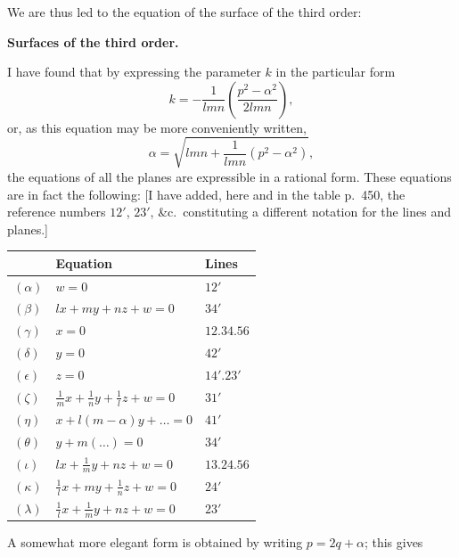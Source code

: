 \documentclass[11pt,a4paper]{book}
\begin{document}
We are thus led to the equation of the surface of the third order:

\newpage

\setcounter{page}{447}

\begin{center}
\textbf{Surfaces of the third order.}
\end{center}

I have found that by expressing the parameter $k$ in the particular form
\[
k = -\frac{1}{lmn}\left(\frac{p^{2} - \alpha^{2}}{2lmn}\right),
\]
or, as this equation may be more conveniently written,
\[
\alpha = \sqrt{lmn + \frac{1}{lmn}(p^{2} - \alpha^{2})},
\]
the equations of all the planes are expressible in a rational form. These equations are in fact the following: [I have added, here and in the table p.~450, the reference numbers $12'$, $23'$, \&c.\ constituting a different notation for the lines and planes.]

\begin{table}[h]
\centering
\begin{tabular}{@{}lll@{}}
\toprule
& Equation & Lines \\
\midrule
$(\alpha)$ & $w = 0$ & $12'$ \\
$(\beta)$ & $lx + my + nz + w = 0$ & $34'$ \\
$(\gamma)$ & $x = 0$ & $12.34.56$ \\
$(\delta)$ & $y = 0$ & $42'$ \\
$(\epsilon)$ & $z = 0$ & $14'.23'$ \\
$(\zeta)$ & $\frac{1}{m}x + \frac{1}{n}y + \frac{1}{l}z + w = 0$ & $31'$ \\
$(\eta)$ & $x + l(m - \alpha)y + \ldots = 0$ & $41'$ \\
$(\theta)$ & $y + m(\ldots) = 0$ & $34'$ \\
$(\iota)$ & $lx + \frac{1}{m}y + nz + w = 0$ & $13.24.56$ \\
$(\kappa)$ & $\frac{1}{l}x + my + \frac{1}{n}z + w = 0$ & $24'$ \\
$(\lambda)$ & $\frac{1}{l}x + \frac{1}{m}y + nz + w = 0$ & $23'$ \\
\bottomrule
\end{tabular}
\end{table}

A somewhat more elegant form is obtained by writing $p = 2q + \alpha$; this gives

\newpage

\setcounter{page}{448}
\end{document}
